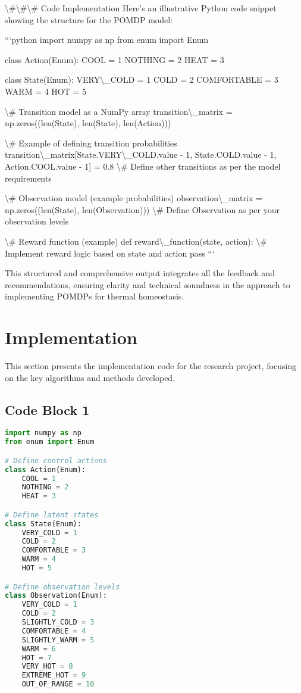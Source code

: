 \documentclass[11pt,a4paper]{article}
\begin{document}
\textbackslash{}#\textbackslash{}#\textbackslash{}# Code Implementation
Here's an illustrative Python code snippet showing the structure for the POMDP model:

```python
import numpy as np
from enum import Enum

class Action(Enum):
    COOL = 1
    NOTHING = 2
    HEAT = 3

class State(Enum):
    VERY\textbackslash{}_COLD = 1
    COLD = 2
    COMFORTABLE = 3
    WARM = 4
    HOT = 5

\textbackslash{}# Transition model as a NumPy array
transition\textbackslash{}_matrix = np.zeros((len(State), len(State), len(Action)))

\textbackslash{}# Example of defining transition probabilities
transition\textbackslash{}_matrix[State.VERY\textbackslash{}_COLD.value - 1, State.COLD.value - 1, Action.COOL.value - 1] = 0.8
\textbackslash{}# Define other transitions as per the model requirements

\textbackslash{}# Observation model (example probabilities)
observation\textbackslash{}_matrix = np.zeros((len(State), len(Observation)))  \textbackslash{}# Define Observation as per your observation levels

\textbackslash{}# Reward function (example)
def reward\textbackslash{}_function(state, action):
    \textbackslash{}# Implement reward logic based on state and action
    pass
```

This structured and comprehensive output integrates all the feedback and recommendations, ensuring clarity and technical soundness in the approach to implementing POMDPs for thermal homeostasis.
\section{Implementation}

This section presents the implementation code for the research project, focusing on the key algorithms and methods developed.


\subsection{Code Block 1}

\begin{lstlisting}[language=Python, caption={Implementation code for the POMDP with Active Inference}]
import numpy as np
from enum import Enum

# Define control actions
class Action(Enum):
    COOL = 1
    NOTHING = 2
    HEAT = 3

# Define latent states
class State(Enum):
    VERY_COLD = 1
    COLD = 2
    COMFORTABLE = 3
    WARM = 4
    HOT = 5

# Define observation levels
class Observation(Enum):
    VERY_COLD = 1
    COLD = 2
    SLIGHTLY_COLD = 3
    COMFORTABLE = 4
    SLIGHTLY_WARM = 5
    WARM = 6
    HOT = 7
    VERY_HOT = 8
    EXTREME_HOT = 9
    OUT_OF_RANGE = 10
\end{lstlisting}
\end{document}
